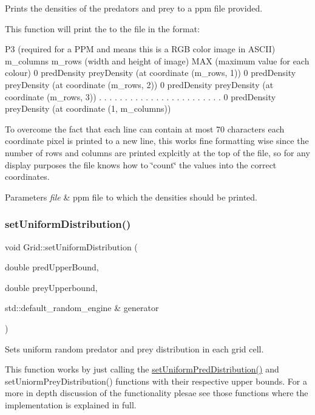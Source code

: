 Prints the densities of the predators and prey to a ppm file provided. 

This function will print the to the file in the format\+:

P3 (required for a P\+PM and means this is a R\+GB color image in A\+S\+C\+II) m\+\_\+columns m\+\_\+rows (width and height of image) M\+AX (maximum value for each colour) 0 pred\+Density prey\+Density (at coordinate (m\+\_\+rows, 1)) 0 pred\+Density prey\+Density (at coordinate (m\+\_\+rows, 2)) 0 pred\+Density prey\+Density (at coordinate (m\+\_\+rows, 3)) . . . . . . . . . . . . . . . . . . . . . . . . 0 pred\+Density prey\+Density (at coordinate (1, m\+\_\+columns))

To overcome the fact that each line can contain at most 70 characters each coordinate pixel is printed to a new line, this works fine formatting wise since the number of rows and columns are printed explcitly at the top of the file, so for any display purposes the file knows how to \char`\"{}count\char`\"{} the values into the correct coordinates.


\begin{DoxyParams}{Parameters}
{\em file} & ppm file to which the densities should be printed. \\
\hline
\end{DoxyParams}
\mbox{\label{class_grid_a17c062fcf4063a811bd8d95c32bce723}} 
\subsubsection{\texorpdfstring{set\+Uniform\+Distribution()}{setUniformDistribution()}}
{\footnotesize\ttfamily void Grid\+::set\+Uniform\+Distribution (\begin{DoxyParamCaption}\item[{double}]{pred\+Upper\+Bound,  }\item[{double}]{prey\+Upperbound,  }\item[{std\+::default\+\_\+random\+\_\+engine \&}]{generator }\end{DoxyParamCaption})}

Sets uniform random predator and prey distribution in each grid cell.

This function works by just calling the \hyperlink{class_grid_a3a67056a86378f8ce24cdf3c19ee7817}{set\+Uniform\+Pred\+Distribution()} and set\+Uniorm\+Prey\+Distribution() functions with their respective upper bounds. For a more in depth discussion of the functionality plesae see those functions where the implementation is explained in full.



